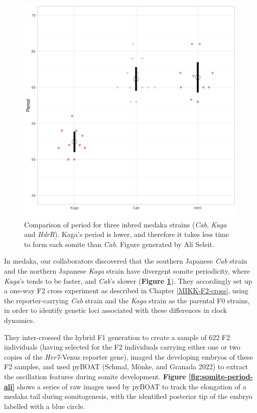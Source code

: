\documentclass[
]{book}
\begin{document}
\begin{figure}
\includegraphics[width=1\linewidth]{figs/somites/ali_period_F0_Cab_Kaga} \caption{Comparison of period for three inbred medaka strains (\emph{Cab}, \emph{Kaga} and \emph{HdrR}). Kaga's period is lower, and therefore it takes less time to form each somite than \emph{Cab}. Figure generated by Ali Seleit.}\label{fig:F0-Cab-Kaga-HdrR}
\end{figure}

In medaka, our collaborators discovered that the southern Japanese \emph{Cab} strain and the northern Japanese \emph{Kaga} strain have divergent somite periodicity, where \emph{Kaga}'s tends to be faster, and \emph{Cab}'s slower (\textbf{Figure \ref{fig:F0-Cab-Kaga-HdrR}}). They accordingly set up a one-way F2 cross experiment as described in Chapter \ref{MIKK-F2-cross}, using the reporter-carrying \emph{Cab} strain and the \emph{Kaga} strain as the parental F0 strains, in order to identify genetic loci associated with these differences in clock dynamics.

They inter-crossed the hybrid F1 generation to create a sample of 622 F2 individuals (having selected for the F2 individuals carrying either one or two copies of the \emph{Her7}-Venus reporter gene), imaged the developing embryos of these F2 samples, and used pyBOAT (Schmal, Mönke, and Granada 2022) to extract the oscillation features during somite development. \textbf{Figure \ref{fig:somite-period-ali}} shows a series of raw images used by pyBOAT to track the elongation of a medaka tail during somitogenesis, with the identified posterior tip of the embryo labelled with a blue circle.
\end{document}
